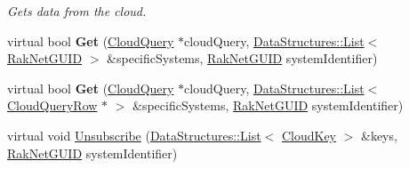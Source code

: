 \begin{DoxyCompactItemize}
\begin{DoxyCompactList}\small\item\em Gets data from the cloud. \end{DoxyCompactList}\item 
\hypertarget{class_rak_net_1_1_cloud_client_a221b5e0f5a7020d2610a39657c213e0d}{virtual bool {\bfseries Get} (\hyperlink{struct_rak_net_1_1_cloud_query}{Cloud\-Query} $\ast$cloud\-Query, \hyperlink{class_data_structures_1_1_list}{Data\-Structures\-::\-List}$<$ \hyperlink{struct_rak_net_1_1_rak_net_g_u_i_d}{Rak\-Net\-G\-U\-I\-D} $>$ \&specific\-Systems, \hyperlink{struct_rak_net_1_1_rak_net_g_u_i_d}{Rak\-Net\-G\-U\-I\-D} system\-Identifier)}\label{class_rak_net_1_1_cloud_client_a221b5e0f5a7020d2610a39657c213e0d}

\item 
\hypertarget{class_rak_net_1_1_cloud_client_ab65b05a6fc5486bf263dfced5dc7efbf}{virtual bool {\bfseries Get} (\hyperlink{struct_rak_net_1_1_cloud_query}{Cloud\-Query} $\ast$cloud\-Query, \hyperlink{class_data_structures_1_1_list}{Data\-Structures\-::\-List}$<$ \hyperlink{struct_rak_net_1_1_cloud_query_row}{Cloud\-Query\-Row} $\ast$ $>$ \&specific\-Systems, \hyperlink{struct_rak_net_1_1_rak_net_g_u_i_d}{Rak\-Net\-G\-U\-I\-D} system\-Identifier)}\label{class_rak_net_1_1_cloud_client_ab65b05a6fc5486bf263dfced5dc7efbf}

\item 
\hypertarget{class_rak_net_1_1_cloud_client_ab23db4329c42bc13c3fe6015ea83609c}{virtual void \hyperlink{class_rak_net_1_1_cloud_client_ab23db4329c42bc13c3fe6015ea83609c}{Unsubscribe} (\hyperlink{class_data_structures_1_1_list}{Data\-Structures\-::\-List}$<$ \hyperlink{struct_rak_net_1_1_cloud_key}{Cloud\-Key} $>$ \&keys, \hyperlink{struct_rak_net_1_1_rak_net_g_u_i_d}{Rak\-Net\-G\-U\-I\-D} system\-Identifier)}\label{class_rak_net_1_1_cloud_client_ab23db4329c42bc13c3fe6015ea83609c}


\end{DoxyCompactItemize}
